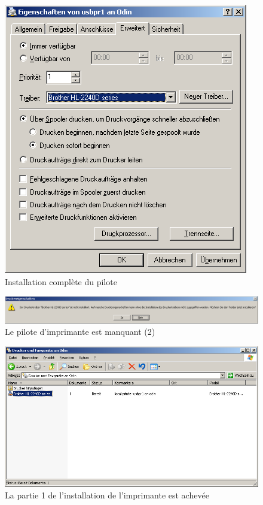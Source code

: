 \begin{figure}[hbt!]
\centering
\includegraphics[width=\columnwidth]{image015}
\caption{Installation complète du pilote}
\label{fig:sambalpd:setup-completed}
\end{figure}

\begin{figure}[hbt!]
\centering
\includegraphics[width=\columnwidth]{image016}
\caption{Le pilote d'imprimante est manquant (2)}
\label{fig:sambalpd:no-driver:2}
\end{figure}

\begin{figure}[hbt!]
\centering
\includegraphics[width=0.8\columnwidth]{image017}
\caption{La partie 1 de l'installation de l'imprimante est achevée}
\label{fig:sambalpd:installed}
\end{figure}

